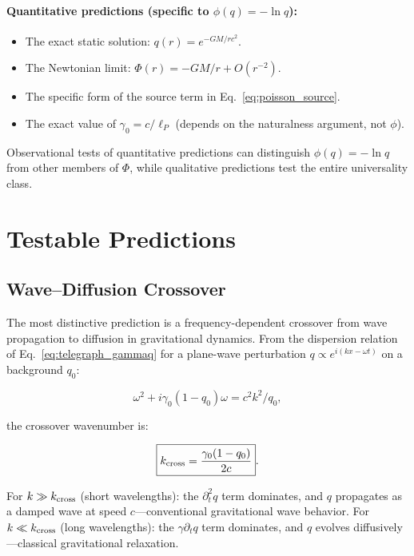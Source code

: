\documentclass[aps,prd,twocolumn,showpacs,superscriptaddress,preprintnumbers]{revtex4-2}
\begin{document}
\paragraph{Quantitative predictions (specific to $\phi(q)=-\ln q$):}
\begin{itemize}
    \item The exact static solution: $q(r)=e^{-GM/rc^2}$.
    \item The Newtonian limit: $\Phi(r)=-GM/r + O(r^{-2})$.
    \item The specific form of the source term in Eq.~\eqref{eq:poisson_source}.
    \item The exact value of $\gamma_0=c/\ell_P$ (depends on the naturalness argument, not $\phi$).
\end{itemize}

Observational tests of quantitative predictions can distinguish $\phi(q)=-\ln q$ from other members of $\Phi$, while qualitative predictions test the entire universality class.

\section{Testable Predictions}
\label{sec:predictions}

\subsection{Wave--Diffusion Crossover}

The most distinctive prediction is a frequency-dependent crossover from wave propagation to diffusion in gravitational dynamics.
From the dispersion relation of Eq.~\eqref{eq:telegraph_gammaq} for a plane-wave perturbation $q\propto e^{i(kx-\omega t)}$ on a background $q_0$:

\begin{equation}
\omega^2 + i\gamma_0(1-q_0)\omega = c^2 k^2/q_0,
\label{eq:dispersion}
\end{equation}

the crossover wavenumber is:

\begin{equation}
\boxed{k_{\rm cross} = \frac{\gamma_0(1-q_0)}{2c}}.
\label{eq:kcross}
\end{equation}

For $k\gg k_{\rm cross}$ (short wavelengths): the $\partial_t^2 q$ term dominates, and $q$ propagates as a damped wave at speed $c$---conventional gravitational wave behavior.
For $k\ll k_{\rm cross}$ (long wavelengths): the $\gamma\partial_t q$ term dominates, and $q$ evolves diffusively---classical gravitational relaxation.
\end{document}
